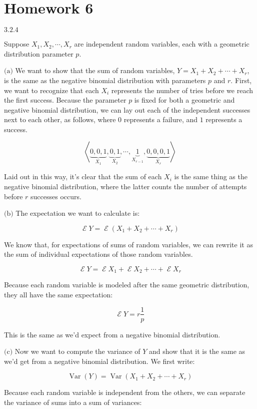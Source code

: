 \documentclass{article}
\newcommand{\problem}[2]{$\boxed{\text{#1.#2}}$}
\newcommand{\subproblem}[3]{$\boxed{\text{(#3)}}$}
\DeclareMathOperator{\var}{Var}
\DeclareMathOperator{\E}{\mathcal{E}}
\begin{document}
\section*{Homework 6}

%
\problem{3.2}{4}

Suppose $X_1,X_2,\cdots,X_r$ are independent random variables, each
with a geometric distribution parameter $p$.

%
\subproblem{3.2}{4}{a} We want to show that the sum of random
variables, $Y=X_1+X_2+\cdots+X_r$, is the same as the negative
binomial distribution with parameters $p$ and $r$. First, we want to
recognize that each $X_i$ represents the number of tries before we
reach the first success. Because the parameter $p$ is fixed for both a
geometric and negative binomial distribution, we can lay out each of
the independent successes next to each other, as follows, where $0$
represents a failure, and $1$ represents a success.

\[
\left\langle \underbrace{0, 0, 1}_{X_1}, \underbrace{0, 1}_{X_2}, \cdots, \underbrace{1}_{X_{r-1}}, \underbrace{0, 0, 0, 1}_{X_r}\right\rangle
\]

Laid out in this way, it's clear that the sum of each $X_i$ is the
same thing as the negative binomial distribution, where the latter
counts the number of attempts before $r$ successes occurs.

%
\subproblem{3.2}{4}{b} The expectation we want to calculate is:

\[
\E Y=\E (X_1+X_2+\cdots+X_r)
\]

We know that, for expectations of sums of random variables, we can
rewrite it as the sum of individual expectations of those random
variables.

\[
\E Y = \E X_1 + \E X_2 + \cdots + \E X_r
\]

Because each random variable is modeled after the same geometric
distribution, they all have the same expectation:

\[
\E Y = r\frac{1}{p}
\]

This is the same as we'd expect from a negative binomial distribution.

%
\subproblem{3.2}{4}{c} Now we want to compute the variance of $Y$ and
show that it is the same as we'd get from a negative binomial
distribution. We first write:

\[
\var(Y)=\var(X_1+X_2+\cdots+X_r)
\]

Because each random variable is independent from the others, we can
separate the variance of sums into a sum of variances:
\end{document}
